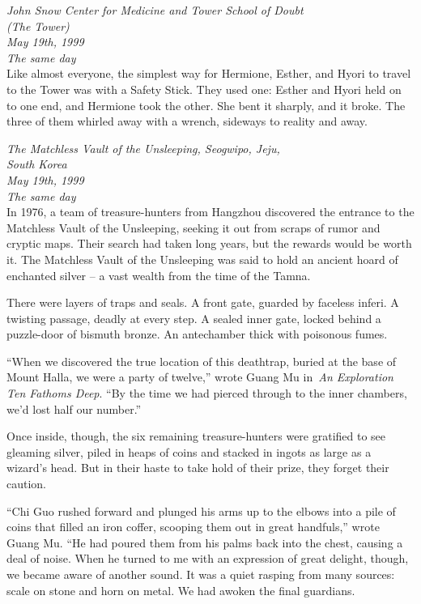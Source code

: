 \mybreak

\emph{John Snow Center for Medicine and Tower School of Doubt\\
(The Tower)}\\
\emph{May 19th, 1999}\\
\emph{The same day}\\

Like almost everyone, the simplest way for Hermione, Esther, and Hyori
to travel to the Tower was with a Safety Stick. They used one: Esther
and Hyori held on to one end, and Hermione took the other. She bent it
sharply, and it broke. The three of them whirled away with a wrench,
sideways to reality and away.

\mybreak

\emph{The Matchless Vault of the Unsleeping, Seogwipo, Jeju,\\
South Korea}\\
\emph{May 19th, 1999}\\
\emph{The same day}\\

In 1976, a team of treasure-hunters from Hangzhou discovered the
entrance to the Matchless Vault of the Unsleeping, seeking it out from
scraps of rumor and cryptic maps. Their search had taken long years, but
the rewards would be worth it. The Matchless Vault of the Unsleeping was
said to hold an ancient hoard of enchanted silver -- a vast wealth from
the time of the Tamna.

There were layers of traps and seals. A front gate, guarded by faceless
inferi. A twisting passage, deadly at every step. A sealed inner gate,
locked behind a puzzle-door of bismuth bronze. An antechamber thick with
poisonous fumes.

``When we discovered the true location of this deathtrap, buried at the
base of Mount Halla, we were a party of twelve,'' wrote Guang Mu
in~\emph{An Exploration Ten Fathoms Deep}. ``By the time we had pierced
through to the inner chambers, we'd lost half our number.''

Once inside, though, the six remaining treasure-hunters were gratified
to see gleaming silver, piled in heaps of coins and stacked in ingots as
large as a wizard's head. But in their haste to take hold of their
prize, they forget their caution.

``Chi Guo rushed forward and plunged his arms up to the elbows into a
pile of coins that filled an iron coffer, scooping them out in great
handfuls,'' wrote Guang Mu. ``He had poured them from his palms back
into the chest, causing a deal of noise. When he turned to me with an
expression of great delight, though, we became aware of another sound.
It was a quiet rasping from many sources: scale on stone and horn on
metal. We had awoken the final guardians.

